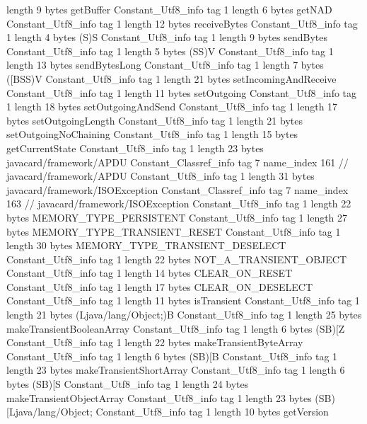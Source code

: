 {{{			length	9
			bytes	getBuffer
		}
		Constant_Utf8_info {
			tag	1
			length	6
			bytes	getNAD
		}
		Constant_Utf8_info {
			tag	1
			length	12
			bytes	receiveBytes
		}
		Constant_Utf8_info {
			tag	1
			length	4
			bytes	(S)S
		}
		Constant_Utf8_info {
			tag	1
			length	9
			bytes	sendBytes
		}
		Constant_Utf8_info {
			tag	1
			length	5
			bytes	(SS)V
		}
		Constant_Utf8_info {
			tag	1
			length	13
			bytes	sendBytesLong
		}
		Constant_Utf8_info {
			tag	1
			length	7
			bytes	([BSS)V
		}
		Constant_Utf8_info {
			tag	1
			length	21
			bytes	setIncomingAndReceive
		}
		Constant_Utf8_info {
			tag	1
			length	11
			bytes	setOutgoing
		}
		Constant_Utf8_info {
			tag	1
			length	18
			bytes	setOutgoingAndSend
		}
		Constant_Utf8_info {
			tag	1
			length	17
			bytes	setOutgoingLength
		}
		Constant_Utf8_info {
			tag	1
			length	21
			bytes	setOutgoingNoChaining
		}
		Constant_Utf8_info {
			tag	1
			length	15
			bytes	getCurrentState
		}
		Constant_Utf8_info {
			tag	1
			length	23
			bytes	javacard/framework/APDU
		}
		Constant_Classref_info {
			tag	7
			name_index	161		// javacard/framework/APDU
		}
		Constant_Utf8_info {
			tag	1
			length	31
			bytes	javacard/framework/ISOException
		}
		Constant_Classref_info {
			tag	7
			name_index	163		// javacard/framework/ISOException
		}
		Constant_Utf8_info {
			tag	1
			length	22
			bytes	MEMORY_TYPE_PERSISTENT
		}
		Constant_Utf8_info {
			tag	1
			length	27
			bytes	MEMORY_TYPE_TRANSIENT_RESET
		}
		Constant_Utf8_info {
			tag	1
			length	30
			bytes	MEMORY_TYPE_TRANSIENT_DESELECT
		}
		Constant_Utf8_info {
			tag	1
			length	22
			bytes	NOT_A_TRANSIENT_OBJECT
		}
		Constant_Utf8_info {
			tag	1
			length	14
			bytes	CLEAR_ON_RESET
		}
		Constant_Utf8_info {
			tag	1
			length	17
			bytes	CLEAR_ON_DESELECT
		}
		Constant_Utf8_info {
			tag	1
			length	11
			bytes	isTransient
		}
		Constant_Utf8_info {
			tag	1
			length	21
			bytes	(Ljava/lang/Object;)B
		}
		Constant_Utf8_info {
			tag	1
			length	25
			bytes	makeTransientBooleanArray
		}
		Constant_Utf8_info {
			tag	1
			length	6
			bytes	(SB)[Z
		}
		Constant_Utf8_info {
			tag	1
			length	22
			bytes	makeTransientByteArray
		}
		Constant_Utf8_info {
			tag	1
			length	6
			bytes	(SB)[B
		}
		Constant_Utf8_info {
			tag	1
			length	23
			bytes	makeTransientShortArray
		}
		Constant_Utf8_info {
			tag	1
			length	6
			bytes	(SB)[S
		}
		Constant_Utf8_info {
			tag	1
			length	24
			bytes	makeTransientObjectArray
		}
		Constant_Utf8_info {
			tag	1
			length	23
			bytes	(SB)[Ljava/lang/Object;
		}
		Constant_Utf8_info {
			tag	1
			length	10
			bytes	getVersion
}}}
